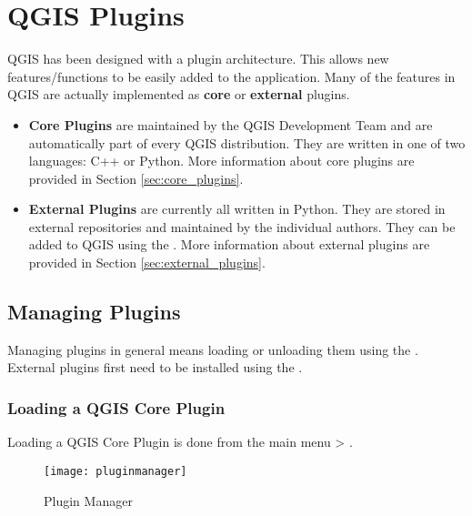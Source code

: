 
\section{QGIS Plugins}\label{sec:plugins}


QGIS has been designed with a plugin architecture.
This allows new features/functions to be easily added to the application.
Many of the features in QGIS are actually implemented as \textbf{core} or \textbf{external} plugins. 

\begin{itemize}
\item \textbf{Core Plugins} are maintained by the QGIS Development Team and are automatically part of every QGIS distribution.
They are written in one of two languages: C++ or Python.
More information about core plugins are provided in Section \ref{sec:core_plugins}.
\item \textbf{External Plugins} are currently all written in Python.
They are stored in external repositories and maintained by the individual authors.
They can be added to QGIS using the .
More information about external plugins are provided in Section \ref{sec:external_plugins}.
\end{itemize}

\subsection{Managing Plugins}\label{sec:managing_plugins}

Managing plugins in general means loading or unloading them using the .
External plugins first need to be installed using the .

\subsubsection{Loading a QGIS Core Plugin}\label{sec:load_core_plugin} 

Loading a QGIS Core Plugin is done from the main menu  > .

\begin{figure}[ht]
   \begin{center}
   \caption{Plugin Manager \nixcaption}\label{fig:pluginmanager}\smallskip
   \texttt{[image: pluginmanager]}
\end{center}
\end{figure}

